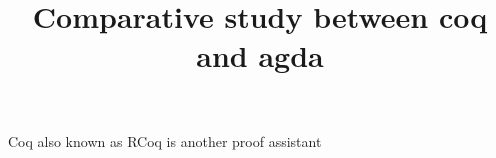 \documentclass{article}
\title{Comparative study between coq and agda }
\begin{document}
\maketitle
    Coq also known as RCoq is another proof assistant 
\end{document}
